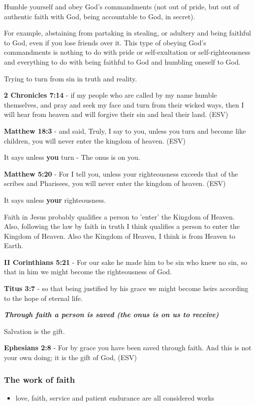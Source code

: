 \documentclass[11pt]{article}
\begin{document}
Humble yourself and obey God's commandments (not out of pride, but out of authentic faith with God, being accountable to God, in secret).

For example, abstaining from partaking in stealing, or adultery and being faithful to God, even if you lose friends over it.
This type of obeying God's commandments is nothing to do with pride or self-exultation or self-righteousness and everything to do with being faithful to God and humbling oneself to God.

Trying to turn from sin in truth and reality.

\textbf{2 Chronicles 7:14} - if my people who are called by my name humble themselves, and pray and seek my face and turn from their wicked ways, then I will hear from heaven and will forgive their sin and heal their land. (ESV)

\textbf{Matthew 18:3} - and said, Truly, I say to you, unless you turn and become like children, you will never enter the kingdom of heaven. (ESV)

It says unless \textbf{you} turn - The onus is on you.

\textbf{Matthew 5:20} - For I tell you, unless your righteousness exceeds that of the scribes and Pharisees, you will never enter the kingdom of heaven. (ESV)

It says unless \textbf{your} righteousness.

Faith in Jesus probably qualifies a person to 'enter' the Kingdom of Heaven.
Also, following the law by faith in truth I think qualifies a person to enter the Kingdom of Heaven.
Also the Kingdom of Heaven, I think is from Heaven to Earth.

\textbf{II Corinthians 5:21} - For our sake he made him to be sin who knew no sin, so that in him we might become the righteousness of God.

\textbf{Titus 3:7} - so that being justified by his grace we might become heirs according to the hope of eternal life.

\emph{\textbf{Through faith a person is saved (the onus is on us to receive)}}

Salvation is the gift.

\textbf{Ephesians 2:8} - For by grace you have been saved through faith. And this is not your own doing; it is the gift of God, (ESV)

\subsubsection{The work of faith}
\label{sec:org22a1973}
\begin{itemize}
\item love, faith, service and patient endurance are all considered works
\end{itemize}
\end{document}
